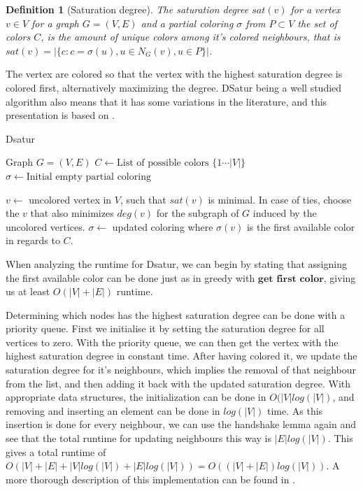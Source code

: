 \documentclass[a4paper]{article}
\newtheorem{definition}{Definition}[section]
\begin{document}
\begin{definition}[Saturation degree]{\cite{Constructive}}
    The saturation degree $sat(v)$ for a vertex $v \in V$ for a graph $G =
    (V,E)$ and a partial coloring $\sigma$ from $P \subset V$ the set of colors $C$, is the amount of unique colors among
    it's colored neighbours, that is $sat(v) = |\{c  : c = \sigma(u), u \in N_G(v),u \in P  \}|$.
\end{definition}

The vertex are colored so that the vertex with the highest saturation degree is
colored first, alternatively maximizing the degree.  DSatur being a well studied
algorithm also means that it has some variations in the literature, and this
presentation is based on \cite{Constructive}.

\begin{algorithm}[H]
  \caption{Dsatur}
  \begin{algorithmic}[1]
      \REQUIRE Graph $G = (V,E)$
      \STATE $C \leftarrow \text{List of possible colors $\{1 \cdots |V| \}$ }$
      \STATE $\sigma \leftarrow \text{Initial empty partial coloring}$


        \STATE $v \leftarrow$ uncolored vertex in $V$, such that $sat(v)$ is
        minimal. In case of ties, choose the $v$ that also minimizes $deg(v)$
        for the subgraph of $G$ induced by the uncolored vertices.
        \STATE $\sigma \leftarrow$ updated coloring where $\sigma(v)$ is the first
        available color in regards to $C$.
      \ENDFOR
  \end{algorithmic}
\end{algorithm}

When analyzing the runtime for Dsatur, we can begin by stating that
assigning the first available color can be done just as in greedy with
$\textbf{get first color}$, giving us at least $O(|V|+|E|)$ runtime. 

Determining which nodes has the highest saturation degree can be done with a
priority queue.  First we initialise it by setting the saturation degree for all
vertices to zero. With the priority queue, we can then get the vertex with the
highest saturation degree in constant time. After having colored it, we update
the saturation degree for it's neighbours, which implies the removal of that
neighbour from the list, and then adding it back with the updated saturation
degree. With appropriate data structures, the initialization can be done in
$O(|V|log(|V|)$, and removing and inserting an element can be done in $log(|V|)$
time. As this insertion is done for every neighbour, we can use the handshake
lemma again and see that the total runtime for updating neighbours this way is
$|E|log(|V|)$. This gives a total runtime of $O(|V|+|E|+|V|log(|V|)+|E|log(|V|))
= O( (|V|+|E|)log(|V|))$. A more thorough description of this implementation can
be found in \cite{Constructive}.
\end{document}
